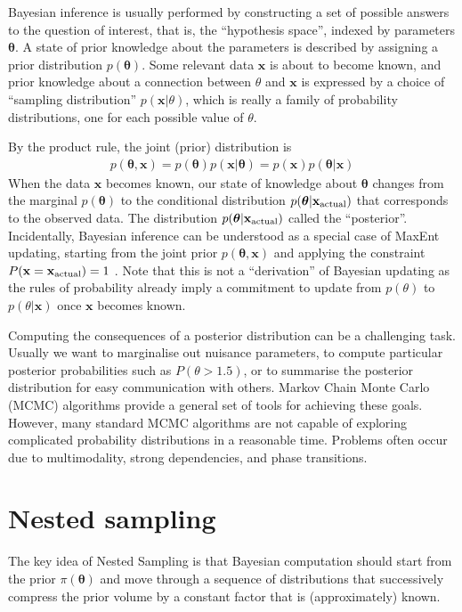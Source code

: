 \documentclass[
  ,final            %
  ]
  {aipproc}
\newcommand{\pars}{\boldsymbol{\theta}}
\newcommand{\data}{\mathbf{x}}
\begin{document}
Bayesian inference is usually performed by
constructing a set of possible answers to the question of
interest, that is, the ``hypothesis space'', indexed by parameters $\pars$.
A state of prior knowledge about the parameters is described by assigning a
prior distribution $p(\pars)$. Some relevant data $\data$ is about to become
known, and prior knowledge about a connection between $\theta$ and $\data$ is
expressed by a choice of ``sampling distribution'' $p(\data | \theta)$, which
is really a family of probability distributions, one for each possible value of
$\theta$.

By the product rule, the joint (prior) distribution is
\begin{eqnarray}
p(\pars, \data) = p(\pars) p(\data | \pars) = p(\data)p(\pars | \data)
\end{eqnarray}
When the
data $\data$ becomes known, our state of knowledge about $\pars$ changes
from the marginal $p(\pars)$ to the conditional distribution
$p(\pars | \data_{\rm actual})$
that corresponds to the observed data. The distribution
$p(\pars | \data_{\rm actual})$
called the ``posterior''.
Incidentally, Bayesian inference can be understood as a special case of
MaxEnt updating, starting from the joint prior $p(\pars, \data)$ and applying
the constraint $P(\data = \data_{\rm actual}) = 1$ \citep{caticha}. Note that
this is not a ``derivation'' of Bayesian updating as the rules of probability
already imply a commitment to update from $p(\theta)$ to $p(\theta | \data)$
once $\data$ becomes known.

Computing the consequences of a posterior distribution can be a challenging
task. Usually we want to marginalise out nuisance parameters, to compute
particular posterior probabilities such as $P(\theta > 1.5)$, or to summarise
the posterior distribution for easy communication with others.
Markov Chain Monte Carlo (MCMC) algorithms provide a general set of tools
for achieving these goals. However, many standard MCMC algorithms are not
capable of exploring complicated probability distributions in a reasonable time.
Problems often occur due to multimodality, strong dependencies, and phase
transitions.

\section{Nested sampling}
The key idea of Nested Sampling \citep{skilling} is that Bayesian computation
should start from the prior $\pi(\pars)$ and move through a sequence of
distributions that successively compress the prior volume by a constant factor
that is (approximately) known.
\end{document}
